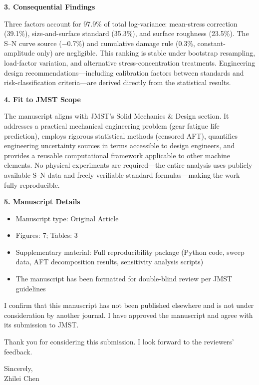 \documentclass[12pt,a4paper]{article}
\begin{document}
\vspace{0.3cm}
\noindent\textbf{3. Consequential Findings}

Three factors account for 97.9\% of total log-variance: mean-stress
correction (39.1\%), size-and-surface standard (35.3\%), and surface
roughness (23.5\%). The S--N curve source ($-$0.7\%) and cumulative
damage rule (0.3\%, constant-amplitude only) are negligible. This
ranking is stable under bootstrap resampling, load-factor variation, and
alternative stress-concentration treatments. Engineering design
recommendations---including calibration factors between standards and
risk-classification criteria---are derived directly from the statistical
results.

\vspace{0.3cm}
\noindent\textbf{4. Fit to JMST Scope}

The manuscript aligns with JMST's Solid Mechanics \& Design section.
It addresses a practical mechanical engineering problem (gear fatigue
life prediction), employs rigorous statistical methods (censored AFT),
quantifies engineering uncertainty sources in terms accessible to design
engineers, and provides a reusable computational framework applicable to
other machine elements. No physical experiments are required---the
entire analysis uses publicly available S--N data and freely verifiable
standard formulas---making the work fully reproducible.

\vspace{0.3cm}
\noindent\textbf{5. Manuscript Details}

\begin{itemize}
  \item Manuscript type: Original Article
  \item Figures: 7; Tables: 3
  \item Supplementary material: Full reproducibility package (Python
        code, sweep data, AFT decomposition results, sensitivity
        analysis scripts)
  \item The manuscript has been formatted for double-blind review per
        JMST guidelines
\end{itemize}

\vspace{0.3cm}
I confirm that this manuscript has not been published elsewhere and is
not under consideration by another journal. I have approved the
manuscript and agree with its submission to JMST.

\vspace{0.5cm}
\noindent Thank you for considering this submission. I look forward to
the reviewers' feedback.

\vspace{0.8cm}
\noindent Sincerely,\\[12pt]
Zhilei Chen
\end{document}
